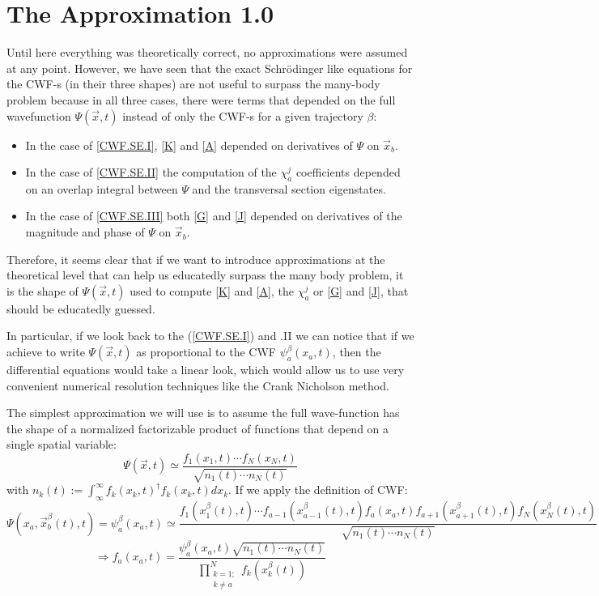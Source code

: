 \documentclass[11pt, a4paper]{article} %
\begin{document}
\newpage
\section{The Approximation 1.0}

Until here everything was theoretically correct, no approximations were assumed at any point. However, we have seen that the exact Schrödinger like equations for the CWF-s (in their three shapes) are not useful to surpass the many-body problem because in all three cases, there were terms that depended on the full wavefunction $\Psi(\vec{x},t)$ instead of only the CWF-s for a given trajectory $\beta$:\vspace{-0.3cm}
\begin{itemize}
\item In the case of \ref{CWF.SE.I}, \ref{K} and \ref{A} depended on derivatives of $\Psi$ on $\vec{x}_b$.

\item In the case of \ref{CWF.SE.II} the computation of the $\chi^j_a$ coefficients depended on an overlap integral between $\Psi$ and the transversal section eigenstates.

\item In the case of \ref{CWF.SE.III} both \ref{G} and \ref{J} depended on derivatives of the magnitude and phase of $\Psi$ on $\vec{x}_b$. 
\end{itemize} 
\vspace{-0.3cm}
Therefore, it seems clear that if we want to introduce approximations at the theoretical level that can help us educatedly surpass the many body problem, it is the shape of $\Psi(\vec{x},t)$ used to compute \ref{K} and \ref{A}, the $\chi_a^j$ or \ref{G} and \ref{J}, that should be educatedly guessed.

In particular, if we look back to the (\ref{CWF.SE.I}) and .II we can notice that if we achieve to write $\Psi(\vec{x},t)$ as proportional to the CWF $\psi_a^\beta(x_a,t)$, then the differential equations would take a linear look, which would allow us to use very convenient numerical resolution techniques like the Crank Nicholson method.

The simplest approximation we will use is to assume the full wave-function has the shape of a normalized factorizable product of functions that depend on a single spatial variable:
$$
\Psi(\vec{x},t)\simeq \frac{f_1(x_1,t)\cdots f_N(x_N,t)}{\sqrt{n_1(t)\cdots n_N(t)}}
$$
with $n_k(t):=\int_{\infty}^\infty f_k(x_k,t)^\dagger f_k(x_k,t)dx_k$. If we apply the definition of CWF:
$$
\Psi(x_a, \vec{x}_b^\beta(t),t)=\psi_a^\beta(x_a,t)\simeq  \frac{f_1(x_1^\beta(t),t)\cdots f_{a-1}(x_{a-1}^\beta(t),t)f_{a}(x_a,t)f_{a+1}(x_{a+1}^\beta(t),t)f_N(x_N^\beta(t),t)}{\sqrt{n_1(t)\cdots n_N(t)}}
$$
$$
\Longrightarrow f_a(x_a,t)=\frac{\psi_a^\beta(x_a,t) \sqrt{n_1(t)\cdots n_N(t)}}{\prod_{\substack{k=1; \\ k\neq a}}^{N} f_k(x_k^\beta(t))}
$$
\end{document}
